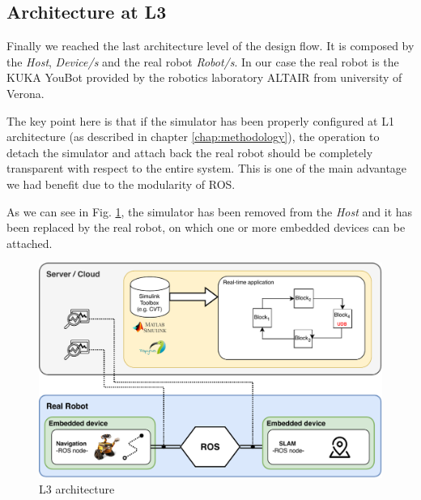 \subsection{Architecture at L3}
Finally we reached the last architecture level of the design flow. It is composed by the \textit{Host}, \textit{Device/s } and the real robot \textit{Robot/s}. In our case the real robot is the KUKA YouBot \cite{YouBot} provided by the robotics laboratory ALTAIR  from university of Verona.

The key point here is that if the simulator has been properly configured at L1 architecture (as described in chapter \ref{chap:methodology}),  the operation to detach the simulator and attach back the real robot should be completely transparent with respect to the entire system. This is one of the main advantage we had benefit due to the modularity of ROS.

As we can see in Fig. \ref{fig:l3archexp}, the simulator has been removed from the \textit{Host} and it has been replaced by the real robot, on which one or more embedded devices can be attached.

\begin{figure}[htbp]
	\centering
	\includegraphics[width=\textwidth]{images/L3-arch}
	\caption{L3 architecture}
	\label{fig:l3archexp}
\end{figure}


